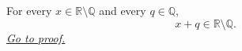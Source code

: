 \begin{lemma}
\label{lem:irrational-plus-rational-is-irrational}
For every $x\in\mathbb{R}\setminus\mathbb{Q}$ and every $q\in\mathbb{Q}$,
\[
  x+q\in\mathbb{R}\setminus\mathbb{Q}.
\]
\hyperref[prf:irrational-plus-rational-is-irrational]{\textit{Go to proof.}}
\end{lemma}